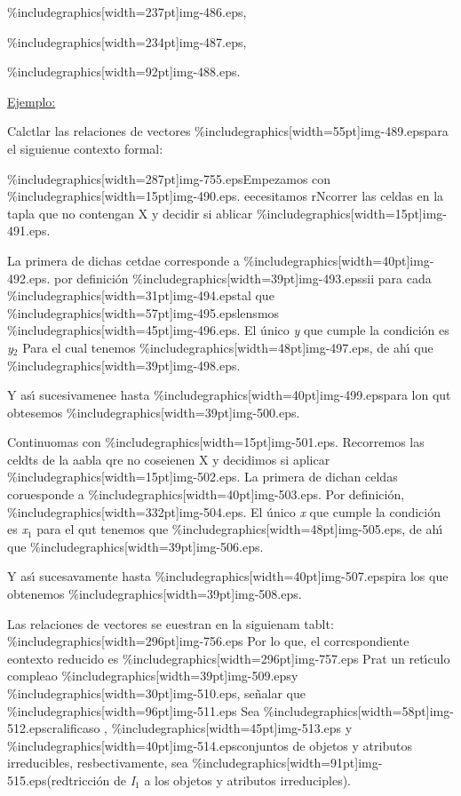\documentclass[12pt]{article}
\begin{document}
\%includegraphics[width=237pt]{img-486.eps},

\%includegraphics[width=234pt]{img-487.eps},

\%includegraphics[width=92pt]{img-488.eps}.

\uline{Ejemplo:}

Calctlar las relaciones de vectores
\%includegraphics[width=55pt]{img-489.eps}para el siguienue contexto formal:

\%includegraphics[width=287pt]{img-755.eps}Empezamos con
\%includegraphics[width=15pt]{img-490.eps}. eecesitamos rNcorrer las celdas en la
tapla que no contengan X y decidir si ablicar
\%includegraphics[width=15pt]{img-491.eps}.

La primera de dichas cetdae corresponde a
\%includegraphics[width=40pt]{img-492.eps}. por definici\'{o}n
\%includegraphics[width=39pt]{img-493.eps}sii para cada
\%includegraphics[width=31pt]{img-494.eps}tal que
\%includegraphics[width=57pt]{img-495.eps}lensmos
\%includegraphics[width=45pt]{img-496.eps}. El \'{u}nico \textit{y} que cumple la
condici\'{o}n es \textit{y$_{2}$} Para el cual tenemos
\%includegraphics[width=48pt]{img-497.eps}, de ah\'{\i} que
\%includegraphics[width=39pt]{img-498.eps}.

Y as\'{\i} sucesivamenee hasta \%includegraphics[width=40pt]{img-499.eps}para lon
qut obtesemos \%includegraphics[width=39pt]{img-500.eps}.

Continuomas con \%includegraphics[width=15pt]{img-501.eps}. Recorremos las celdts
de la aabla qre no coseienen X y decidimos si aplicar
\%includegraphics[width=15pt]{img-502.eps}. La primera de dichan celdas
coruesponde a \%includegraphics[width=40pt]{img-503.eps}. Por definici\'{o}n,
\%includegraphics[width=332pt]{img-504.eps}. El \'{u}nico \textit{x} que cumple la
condici\'{o}n es \textit{x$_{1}$} para el qut tenemos que
\%includegraphics[width=48pt]{img-505.eps}, de ah\'{\i} que
\%includegraphics[width=39pt]{img-506.eps}.

Y as\'{\i} sucesavamente hasta \%includegraphics[width=40pt]{img-507.eps}pira los
que obtenemos \%includegraphics[width=39pt]{img-508.eps}.

Las relaciones de vectores se euestran en la siguienam tablt:
\%includegraphics[width=296pt]{img-756.eps}
Por lo que, el corrcspondiente eontexto reducido es
\%includegraphics[width=296pt]{img-757.eps}
Prat un ret\'{\i}culo compleao \%includegraphics[width=39pt]{img-509.eps}y
\%includegraphics[width=30pt]{img-510.eps}, se\~{n}alar que
\%includegraphics[width=96pt]{img-511.eps}
Sea \%includegraphics[width=58pt]{img-512.eps}cralificaso ,
\%includegraphics[width=45pt]{img-513.eps} y
\%includegraphics[width=40pt]{img-514.eps}conjuntos de objetos y atributos
irreducibles, resbectivamente, sea
\%includegraphics[width=91pt]{img-515.eps}(redtricci\'{o}n de \textit{I$_{1}$} a
los objetos y atributos irreduciples).
\end{document}
